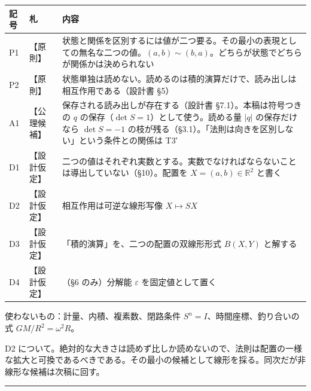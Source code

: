 \documentclass[
  a4paper,
]{ltjsarticle}
\newcounter{none} %
\begin{document}
{\def\LTcaptype{none} %
\begin{longtable}[]{@{}
  >{\raggedright\arraybackslash}p{}
  >{\raggedright\arraybackslash}p{}
  >{\raggedright\arraybackslash}p{}@{}}
\toprule\noalign{}
\begin{minipage}[b]{\linewidth}\raggedright
記号
\end{minipage} & \begin{minipage}[b]{\linewidth}\raggedright
札
\end{minipage} & \begin{minipage}[b]{\linewidth}\raggedright
内容
\end{minipage} \\
\midrule\noalign{}
\endhead
\bottomrule\noalign{}
\endlastfoot
P1 & 【原則】 &
状態と関係を区別するには値が二つ要る。その最小の表現としての無名な二つの値。\((a,b)\sim(b,a)\)。どちらが状態でどちらが関係かは決められない \\
P2 & 【原則】 &
状態単独は読めない。読めるのは積的演算だけで、読み出しは相互作用である（設計書
§5） \\
A1 & 【公理候補】 & 保存される読み出しが存在する（設計書
§7.1）。本稿は符号つきの \(q\)
の保存（\(\det S=1\)）として使う。読める量 \(\lvert q\rvert\)
の保存だけなら \(\det S=-1\)
の枝が残る（§3.1）。「法則は向きを区別しない」という条件との関係は
T3′ \\
D1 & 【設計仮定】 &
二つの値はそれぞれ実数とする。実数でなければならないことは導出していない（§10）。配置を
\(X=(a,b)\in\mathbb R^2\) と書く \\
D2 & 【設計仮定】 & 相互作用は可逆な線形写像 \(X\mapsto SX\) \\
D3 & 【設計仮定】 & 「積的演算」を、二つの配置の双線形形式 \(B(X,Y)\)
と解する \\
D4 & 【設計仮定】 & （§6 のみ）分解能 \(\varepsilon\)
を固定値として置く \\
\end{longtable}
}

使わないもの：計量、内積、複素数、閉路条件
\(S^n=I\)、時間座標、釣り合いの式 \(GM/R^2=\omega^2R\)。

D2
について。絶対的な大きさは読めず比しか読めないので、法則は配置の一様な拡大と可換であるべきである。その最小の候補として線形を採る。同次だが非線形な候補は次稿に回す。

\begin{center}\rule{0.5\linewidth}{0.5pt}\end{center}
\end{document}
